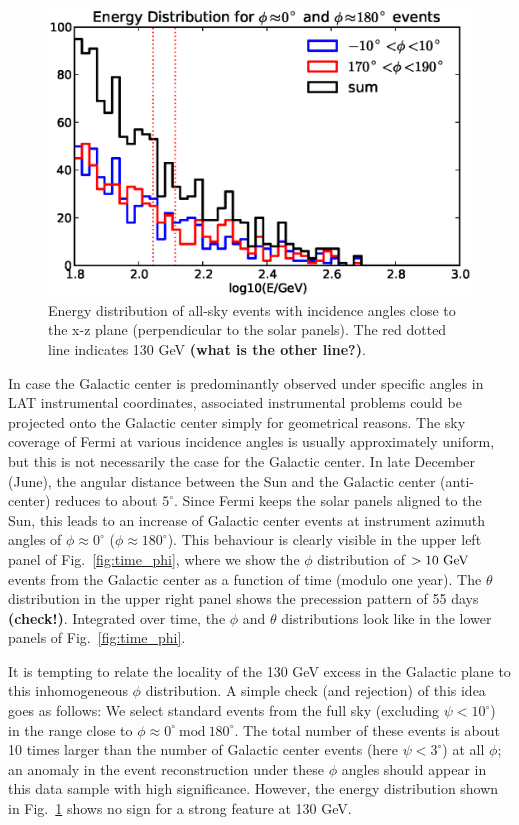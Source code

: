 \documentclass[aps,twocolumn,prd,superscriptaddress,showpacs,nofootinbib,fixfloat]{revtex4}
\newcommand{\GeV}{{\rm ~GeV}}
\begin{document}
\begin{figure}
\centering
\includegraphics[width=1.0\linewidth]{plots/phi_energy.eps}
\caption{Energy distribution of all-sky events with incidence angles close to
the x-z plane (perpendicular to the solar panels). The red dotted line
indicates 130 GeV \textbf{(what is the other line?)}.}
\label{fig:spectrum_phi}
\end{figure}

In case the Galactic center is predominantly observed under specific angles in
LAT instrumental coordinates, associated instrumental problems could be
projected onto the Galactic center simply for geometrical reasons. The sky
coverage of Fermi at various incidence angles is usually approximately uniform,
but this is not necessarily the case for the Galactic center.  In late December
(June), the angular distance between the Sun and the Galactic center
(anti-center) reduces to about $5^\circ$.  Since Fermi keeps the solar panels
aligned to the Sun, this leads to an increase of Galactic center events at
instrument azimuth angles of $\phi\approx 0^\circ$ ($\phi\approx 180^\circ$).
This behaviour is clearly visible in the upper left panel of Fig.~\ref{fig:time_phi}, where we show
the $\phi$ distribution of $>10\GeV$ events from the Galactic center as
a function of time (modulo one year).  The $\theta$ distribution in the upper
right panel shows the precession pattern of 55 days \textbf{(check!)}.
Integrated over time, the $\phi$ and $\theta$ distributions look like in the
lower panels of Fig.~\ref{fig:time_phi}.

It is tempting to relate the locality of the 130 GeV excess in the Galactic
plane to this inhomogeneous $\phi$ distribution. A simple check (and
rejection) of this idea goes as follows: We select standard events from the
full sky (excluding $\psi < 10^\circ$) in the range close to $\phi\approx
0^\circ\ \text{mod}\ 180^\circ$. The total number of these events is about 10
times larger than the number of Galactic center events (here $\psi<3^\circ$)
at all $\phi$; an anomaly in the event reconstruction under these $\phi$
angles should appear in this data sample with high significance. However, the
energy distribution shown in Fig.~\ref{fig:spectrum_phi} shows no sign for a
strong feature at 130 GeV.
\end{document}
